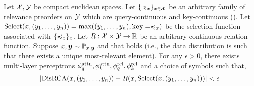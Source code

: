 \begin{theorem}\label{theorem:func_class}
  Let ${\mathcal{X}}, {\mathcal{Y}}$ be compact euclidean spaces. Let $\{\preccurlyeq_x\}_{x \in {\mathcal{X}}}$ be an arbitrary family of relevance preorders on ${\mathcal{Y}}$ which are query-continuous and key-continuous (). Let $\mathrm{Select}(x, (y_1, \ldots, y_n)) = \max((y_1, \ldots, y_n), \mathtt{key}=\preccurlyeq_x)$ be the selection function associated with $\{\preccurlyeq_x\}_{x}$. Let $R: {\mathcal{X}} \times {\mathcal{Y}} \to \mathbb{R}$ be an arbitrary continuous relation function. Suppose $x, \bm{y} \sim {\mathbb{P}}_{x, \bm{y}}$ and that  holds (i.e., the data distribution is such that there exists a unique most-relevant element). For any $\epsilon > 0$, there exists multi-layer perceptrons $\phi_q^{\mathrm{attn}}, \phi_k^{\mathrm{attn}}, \phi_q^{\mathrm{rel}}, \phi_k^{\mathrm{rel}}$ and a choice of symbols such that,
  \begin{equation*}
    \left\lvert\mathrm{DisRCA}(x, (y_1, \ldots, y_n)) - R(x, \mathrm{Select}(x, (y_1, \ldots, y_n)))\right\rvert < \epsilon
  \end{equation*}
\end{theorem}

